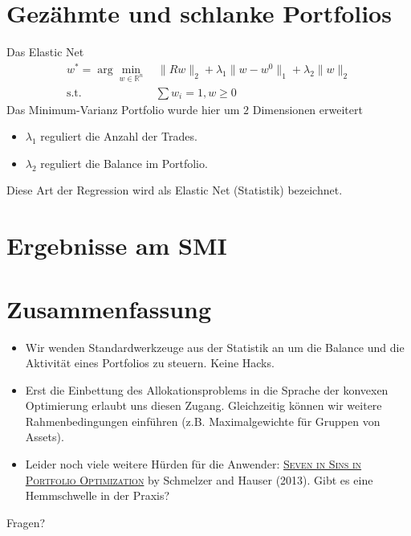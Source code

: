 \documentclass[10pt]{beamer}
\newcommand{\R}{\mathbb R}
\providecommand{\norm}[1]{\lVert#1\rVert}
\begin{document}
\section{Gezähmte und schlanke Portfolios}
\begin{frame}{Das Elastic Net}
\begin{align}
w^*=\arg\min_{w\in\R^n}&\, \norm{Rw}_2 + \lambda_1 \norm{w-w^0}_1 + \lambda_2 \norm{w}_2 \\
\text{s.t. }&\sum w_i = 1, w\geq 0\nonumber
\end{align}
Das Minimum-Varianz Portfolio wurde hier um $2$ Dimensionen erweitert
\begin{itemize}
\item $\lambda_1$ reguliert die Anzahl der Trades.
\item $\lambda_2$ reguliert die Balance im Portfolio.
\end{itemize}
Diese Art der Regression wird als Elastic Net (Statistik) bezeichnet.
\end{frame}

\section{Ergebnisse am SMI}

\begin{frame}

\end{frame}

\section{Zusammenfassung}

\begin{frame}
\begin{itemize}
\item Wir wenden Standardwerkzeuge aus der Statistik an um die Balance und die Aktivität eines Portfolios zu steuern. Keine Hacks.
\item Erst die Einbettung des Allokationsproblems in die Sprache der konvexen Optimierung erlaubt uns diesen Zugang. Gleichzeitig können wir weitere Rahmenbedingungen einführen (z.B. Maximalgewichte für Gruppen von Assets).
\item Leider noch viele weitere Hürden für die Anwender: \href{https://arxiv.org/abs/1310.3396}{\textsc{Seven in Sins in Portfolio Optimization}} by Schmelzer and Hauser (2013). Gibt es eine Hemmschwelle in der Praxis?
\end{itemize}
\end{frame}

{
\begin{frame}[standout]
  Fragen?
\end{frame}
}
\end{document}
